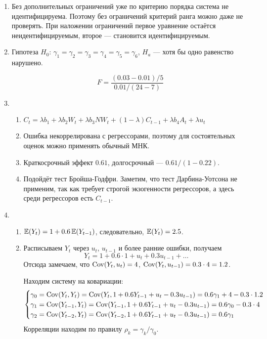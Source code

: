 \begin{enumerate}
  \item Без дополнительных ограничений уже по критерию порядка система не идентифицируема. 
  Поэтому без ограничений критерий ранга можно даже не проверять.
  При наложении ограничений первое уравнение остаётся неидентифицируемым, второе — становится идентифицируемым.
  \item   
  Гипотеза $H_0$: $\gamma_1 = \gamma_2 = \gamma_3 = \gamma_4 = \gamma_5 = \gamma_6$, $H_a$ — хотя бы одно равенство нарушено.
  
  \[
  F = \frac{(0.03 - 0.01) / 5}{0.01 / (24-7)}  
  \]

  \item 
  \begin{enumerate}
    \item $C_t = \lambda b_1 + \lambda b_2 W_t + \lambda b_3 NW_t + (1-\lambda) C_{t-1} + \lambda b_4 A_t + \lambda u_t$
    \item Ошибка некоррелирована с регрессорами, поэтому для состоятельных оценок можно применять обычный МНК.
    \item Краткосрочный эффект $0.61$, долгосрочный — $0.61/(1-0.22)$.
    \item Подойдёт тест Бройша-Годфри. Заметим, что тест Дарбина-Уотсона не применим, так как требует строгой 
    экзогенности регрессоров, а здесь среди регрессоров есть $C_{t-1}$.
  \end{enumerate}

  \item 
  \begin{enumerate}
    \item $\operatorname{\mathbb{E}}(Y_t) = 1 + 0.6 \operatorname{\mathbb{E}}(Y_{t-1})$, следовательно, $\operatorname{\mathbb{E}}(Y_t) = 2.5$.
    \item Расписываем $Y_t$ через $u_t$, $u_{t-1}$ и более ранние ошибки, получаем
    \[
    Y_t = 1 + 0.6 \cdot 1 + u_t + 0.3 u_{t-1} + \ldots  
    \]
    Отсюда замечаем, что $\operatorname{Cov}(Y_t, u_t) = 4$, $\operatorname{Cov}(Y_t, u_{t-1}) = 0.3\cdot 4 = 1.2$.
    
    Находим систему на ковариации:
    \[
    \begin{cases}
      \gamma_0 = \operatorname{Cov}(Y_t, Y_t) = \operatorname{Cov}(Y_t, 1 + 0.6Y_{t-1} + u_t - 0.3 u_{t-1}) = 0.6\gamma_1 + 4 - 0.3\cdot 1.2 \\
      \gamma_1 = \operatorname{Cov}(Y_{t-1}, Y_t) = \operatorname{Cov}(Y_{t-1}, 1 + 0.6Y_{t-1} + u_t - 0.3 u_{t-1}) = 0.6\gamma_0 - 0.3 \cdot 4 \\
      \gamma_2 = \operatorname{Cov}(Y_{t-2}, Y_t) = \operatorname{Cov}(Y_{t-2}, 1 + 0.6Y_{t-1} + u_t - 0.3 u_{t-1}) = 0.6\gamma_1 \\
    \end{cases}
    \]
    Корреляции находим по правилу $\rho_k = \gamma_k / \gamma_0$.


\end{enumerate}
\end{enumerate}
